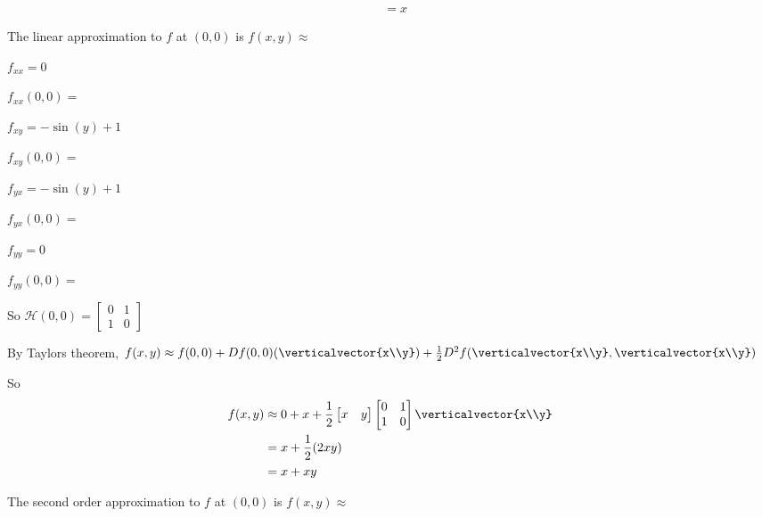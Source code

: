 \documentclass{ximera}
\begin{document}
\begin{question}
\begin{solution}
\begin{hint}
\begin{align*}
						&= x
				\end{align*}
			\end{hint}
			The linear approximation to $f$ at $(0,0)$ is $f(x,y) \approx$ 
		\end{solution}
		\begin{solution}
			\begin{hint}
				\begin{question}
					\begin{solution}
						\begin{hint}
							$f_{xx}= 0$
						\end{hint}
						$f_{xx}(0,0) = $
					\end{solution}
					\begin{solution}
						\begin{hint}
							$f_{xy} = -\sin(y)+1$
						\end{hint}
						$f_{xy}(0,0) = $\answer{1}
					\end{solution}
					\begin{solution}
					\begin{hint}
							$f_{yx} = -\sin(y)+1$
						\end{hint}
						$f_{yx}(0,0) = $
					\end{solution}
					\begin{solution}
					\begin{hint}
							$f_{yy} = 0$
						\end{hint}
						$f_{yy}(0,0) = $\answer{0}
					\end{solution}
				\end{question}
			\end{hint}
			\begin{hint}
				So \(\mathcal{H}(0,0) = \begin{bmatrix} 0&1 \\ 1&0\end{bmatrix}\)
			\end{hint}
			\begin{hint}
				By Taylors theorem, $f(x,y) \approx f(0,0)+Df(0,0)(\verticalvector{x\\y})+\frac{1}{2}D^2f(\verticalvector{x\\y},\verticalvector{x\\y})$
			\end{hint}
			\begin{hint}
				So \begin{align*}
				f(x,y) &\approx 0+x+\frac{1}{2}\begin{bmatrix} x & y \end{bmatrix} \begin{bmatrix} 0&1 \\ 1&0\end{bmatrix} \verticalvector{x\\y}\\
					&=x+\frac{1}{2} (2xy)\\
					&=x+xy
					\end{align*}
			\end{hint}
			The second order approximation to $f$ at $(0,0)$ is $f(x,y) \approx$ \answer{$x+xy$}
		\end{solution}
		

\end{question}
\end{document}

